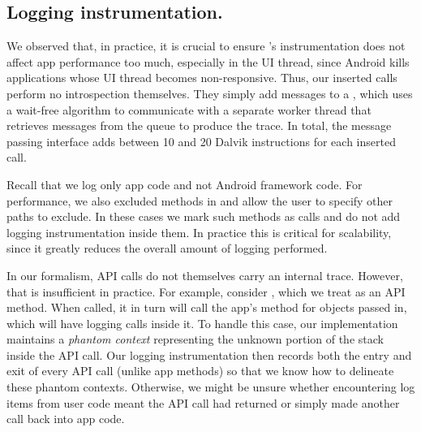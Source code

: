 \subsection{Logging instrumentation.}

We observed that, in practice, it is crucial to ensure \hogarth{}'s
instrumentation does not affect app performance too much, especially
in the UI thread, since Android kills applications whose UI thread
becomes non-responsive. Thus, our inserted  calls perform no
introspection themselves. They simply add messages to a
, which uses a wait-free algorithm to
communicate with a separate worker thread that retrieves messages from
the queue to produce the trace.  In total, the message passing
interface adds between 10 and 20 Dalvik instructions for each inserted
 call.

Recall that we log only app code and not Android framework code. For
performance, we also excluded methods in  and allow
the user to specify other paths to exclude. In these cases we mark such
methods as  calls and do not add logging instrumentation inside them.
In practice this is critical for scalability, since it greatly reduces
the overall amount of logging performed.

In our formalism, API calls do not themselves carry an internal
trace. However, that is insufficient in practice.  For example,
consider , which we treat as an API
method. When called, it in turn will call the app's 
method for objects passed in, which will have logging calls inside
it. To handle this case, our implementation maintains a
\textit{phantom context} representing the unknown portion of the stack
inside the API call. Our logging instrumentation then records both the
entry and exit of every API call (unlike app methods) so that we know
how to delineate these phantom contexts. Otherwise, we might be unsure
whether encountering log items from user code meant the API call had returned
or simply made another call back into app code.



